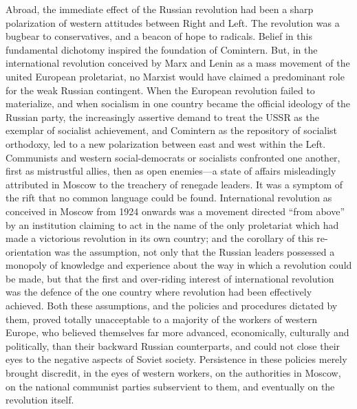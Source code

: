 Abroad, the immediate effect of the Russian revolution had been a sharp polarization of western attitudes between Right and Left. The revolution was a bugbear to conservatives, and a beacon of hope to radicals. Belief in this fundamental dichotomy inspired the foundation of Comintern. But, in the international revolution conceived by Marx and Lenin as a mass movement of the united European proletariat, no Marxist would have claimed a predominant role for the weak Russian contingent. When the European revolution failed to materialize, and when socialism in one country became the official ideology of the Russian party, the increasingly assertive demand to treat the USSR as the exemplar of socialist achievement, and Comintern as the repository of socialist orthodoxy, led to a new polarization between east and west within the Left. Communists and western social-democrats or socialists confronted one another, first as mistrustful allies, then as open enemies---a state of affairs misleadingly attributed in Moscow to the treachery of renegade leaders. It was a symptom of the rift that no common language could be found. International revolution as conceived in Moscow from 1924 onwards was a movement directed ``from above'' by an institution claiming to act in the name of the only proletariat which had made a victorious revolution in its own country; and the corollary of this re-orientation was the assumption, not only that the Russian leaders possessed a monopoly of knowledge and experience about the way in which a revolution could be made, but that the first and over-riding interest of international revolution was the defence of the one country where revolution had been effectively achieved. Both these assumptions, and the policies and procedures dictated by them, proved totally unacceptable to a majority of the workers of western Europe, who believed themselves far more advanced, economically, culturally and politically, than their backward Russian counterparts, and could not close their eyes to the negative aspects of Soviet society. Persistence in these policies merely brought discredit, in the eyes of western workers, on the authorities in Moscow, on the national communist parties subservient to them, and eventually on the revolution itself. 

